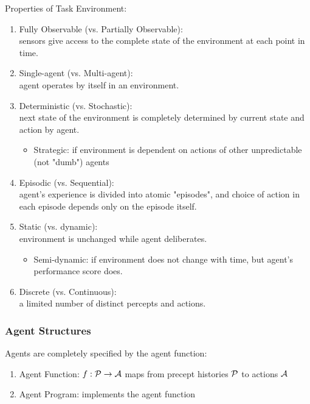 \documentclass[12pt, a4paper]{article}
\begin{document}
\begin{multicols*}{3}
Properties of Task Environment:
\begin{enumerate}[\roman*.]
  \item Fully Observable (vs. Partially Observable):\\sensors give access to the complete state of the environment at each point in time. 
  \item Single-agent (vs. Multi-agent):\\agent operates by itself in an environment.
  \item Deterministic (vs. Stochastic):\\next state of the environment is completely determined by current state and action by agent.
    \begin{itemize}[leftmargin=*]\vspace{3pt}
      \item Strategic: if environment is dependent on actions of other unpredictable (not "dumb") agents 
    \end{itemize}
  \item Episodic (vs. Sequential):\\ agent's experience is divided into atomic "episodes", and choice of action in each episode depends only on the episode itself.
  \item Static (vs. dynamic):\\ environment is unchanged while agent deliberates.
    \begin{itemize}[leftmargin=*]\vspace{3pt}
      \item Semi-dynamic: if environment does not change with time, but agent's performance score does.
    \end{itemize}
  \item Discrete (vs. Continuous):\\a limited number of distinct percepts and actions.
\end{enumerate}\vspace{-1em}
\colbreak

\subsubsection{Agent Structures}
Agents are completely specified by the agent function:
\begin{enumerate}[\roman*.]
  \item Agent Function: $f: \mathcal{P} \rightarrow \mathcal{A}$ maps from precept histories $\mathcal{P}$ to actions $\mathcal{A}$
  \item Agent Program: implements the agent function
\end{enumerate}


\end{multicols*}
\end{document}
